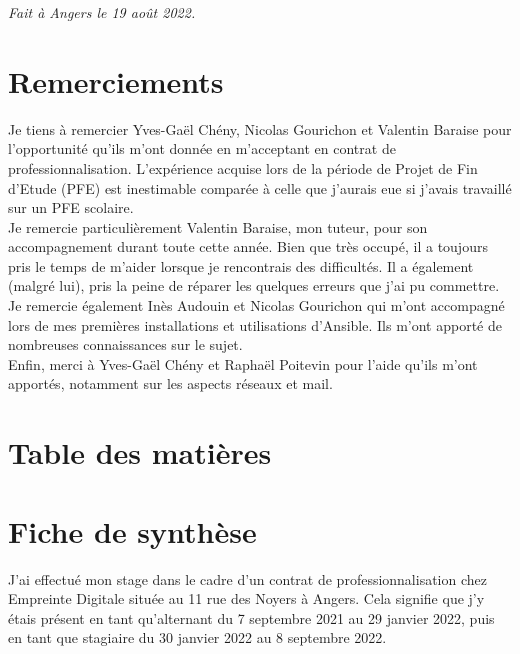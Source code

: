 \documentclass[12pt, a4paper, twoside]{article}
\begin{document}
\textit{Fait à Angers le 19 août 2022.}

\newpage
\section*{Remerciements}
Je tiens à remercier Yves-Gaël Chény, Nicolas Gourichon et Valentin Baraise pour l'opportunité qu'ils m'ont donnée en m'acceptant en contrat de professionnalisation. 
L'expérience acquise lors de la période de Projet de Fin d'Etude (\gls{PFE}) est inestimable comparée à celle que j'aurais eue si j'avais travaillé sur un \gls{PFE} scolaire. \\

Je remercie particulièrement Valentin Baraise, mon tuteur, pour son accompagnement durant toute cette année. 
Bien que très occupé, il a toujours pris le temps de m'aider lorsque je rencontrais des difficultés. 
Il a également (malgré lui), pris la peine de réparer les quelques erreurs que j'ai pu commettre. \\

Je remercie également Inès Audouin et Nicolas Gourichon qui m'ont accompagné lors de mes premières installations et utilisations d'\gls{Ansible}. 
Ils m'ont apporté de nombreuses connaissances sur le sujet. \\

Enfin, merci à Yves-Gaël Chény et Raphaël Poitevin pour l'aide qu'ils m'ont apportés, notamment sur les aspects réseaux et mail.


\newpage
\section*{ Table des matières}
\tableofcontents

\newpage
\section*{Fiche de synthèse}
J'ai effectué mon stage dans le cadre d'un contrat de professionnalisation chez Empreinte Digitale située au 11 rue des Noyers à Angers.
Cela signifie que j'y étais présent en tant qu'alternant du 7 septembre 2021 au 29 janvier 2022, puis en tant que stagiaire du 30 janvier 2022 au 8 septembre 2022. \\
\end{document}
